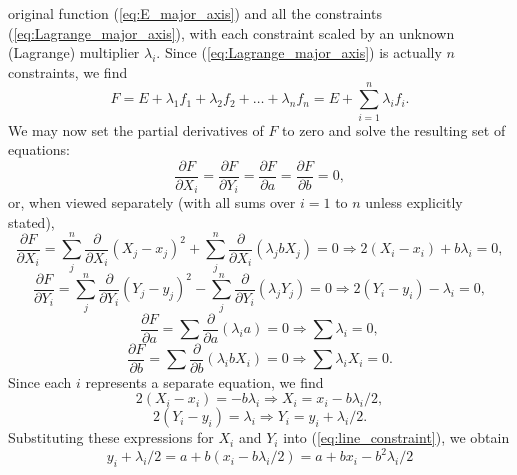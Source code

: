 original function (\ref{eq:E_major_axis}) and all the constraints (\ref{eq:Lagrange_major_axis}), with each constraint scaled by an unknown 
(Lagrange) multiplier $\lambda _i$.  Since (\ref{eq:Lagrange_major_axis}) is actually $n$ constraints, we find
\begin{equation}
F = E + \lambda_1 f_1 + \lambda_2 f_2 + \ldots + \lambda_n f_n = E + \sum ^n _{i=1} \lambda_i f_i.
\label{eq:MA_partials}
\end{equation}	 
We may now set the partial derivatives of $F$ to zero and solve the resulting set of equations:
\begin{equation}
\frac{\partial F}{\partial X_i} = \frac{\partial F}{\partial Y_i} = \frac{\partial F}{\partial a} = \frac{\partial F}{\partial b} = 0,
\end{equation}
or, when viewed separately (with all sums over $i = 1$ to $n$ unless explicitly stated), 
\begin{equation}
\frac{\partial F}{\partial X_i} = \sum_j^n \frac{\partial}{\partial X_i} ( X_j - x_j)^2  + \sum_j^n \frac{\partial}{\partial X_i}
(\lambda_j bX_j) = 0 \Rightarrow 2(X_i - x_i) + b \lambda_i = 0,
\end{equation}
\begin{equation}
\frac{\partial F}{\partial Y_i} = \sum_j^n \frac{\partial}{\partial Y_i} ( Y_j - y_j)^2  - \sum_j^n \frac{\partial}{\partial Y_i}
(\lambda_j Y_j) = 0  \Rightarrow 2(Y_i - y_i) -  \lambda_i = 0,
\end{equation}
\begin{equation}
\frac{\partial F}{\partial a} = \sum  \frac{\partial}{\partial a} (\lambda_i a) = 0  \Rightarrow \sum \lambda_i  = 0,
\label{eq:lambda_major}
\end{equation}
\begin{equation}
\frac{\partial F}{\partial b} = \sum \frac{\partial}{\partial b}(\lambda_i bX_i) = 0  \Rightarrow \sum \lambda_i X_i = 0.
\label{eq:lambda_x_major}
\end{equation}
Since each $i$ represents a separate equation, we find
\begin{equation}
2(X_i - x_i) = -b \lambda_i \Rightarrow X_i = x_i - b \lambda_i/2,
\label{eq:Xisolution}
\end{equation}
\begin{equation}
2(Y_i - y_i) = \lambda_i \Rightarrow Y_i = y_i + \lambda_i/2.
\end{equation}	 
Substituting these expressions for $X_i$ and $Y_i$ into (\ref{eq:line_constraint}), we obtain
\begin{equation}
y_i + \lambda_i/2 = a + b \left (x_i - b \lambda_i/2 \right ) = a + bx_i - b^2 \lambda_i/2
\end{equation}	 
